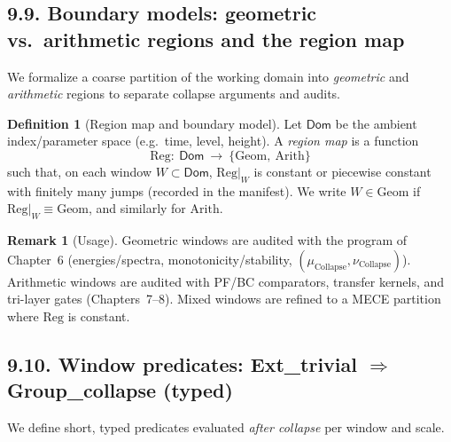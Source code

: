 \documentclass[11pt]{article}
\numberwithin{equation}{section}
\theoremstyle{plain}
\theoremstyle{definition}
\theoremstyle{remark}
\DeclareRobustCommand{\hyp}{\nobreakdash-}
\theoremstyle{plain}
\theoremstyle{definition}
\numberwithin{equation}{section}
\theoremstyle{definition}
\newtheorem{definition}[theorem]{Definition}
\newtheorem{remark}[theorem]{Remark}
\DeclareRobustCommand{\muc}{\mu_{\mathrm{Collapse}}}
\DeclareRobustCommand{\nuc}{\nu_{\mathrm{Collapse}}}
\numberwithin{equation}{section}
\theoremstyle{plain}
\theoremstyle{definition}
\theoremstyle{remark}
\providecommand{\muc}{\mu_{\mathrm{Collapse}}}
\providecommand{\nuc}{\nu_{\mathrm{Collapse}}}
\begin{document}

\subsection*{9.9. Boundary models: geometric vs.\ arithmetic regions and the region map}
We formalize a coarse partition of the working domain into \emph{geometric} and \emph{arithmetic} regions to separate collapse arguments and audits.

\begin{definition}[Region map and boundary model]\label{def:region}
Let \(\mathsf{Dom}\) be the ambient index/parameter space (e.g.\ time, level, height).
A \emph{region map} is a function
\[
\mathrm{Reg}:\ \mathsf{Dom}\ \longrightarrow\ \{\mathrm{Geom},\ \mathrm{Arith}\}
\]
such that, on each window \(W\subset \mathsf{Dom}\), \(\mathrm{Reg}|_W\) is constant or piecewise constant with finitely many jumps (recorded in the manifest).
We write \(W\in\mathrm{Geom}\) if \(\mathrm{Reg}|_W\equiv \mathrm{Geom}\), and similarly for \(\mathrm{Arith}\).
\end{definition}

\begin{remark}[Usage]
Geometric windows are audited with the program of Chapter~6 (energies/spectra, monotonicity/stability, \((\muc,\nuc)\)).
Arithmetic windows are audited with PF/BC comparators, transfer kernels, and tri\hyp layer gates (Chapters~7–8).
Mixed windows are refined to a MECE partition where \(\mathrm{Reg}\) is constant.
\end{remark}

\subsection*{9.10. Window predicates: Ext\_trivial \(\Rightarrow\) Group\_collapse (typed)}
We define short, typed predicates evaluated \emph{after collapse} per window and scale.
\end{document}
